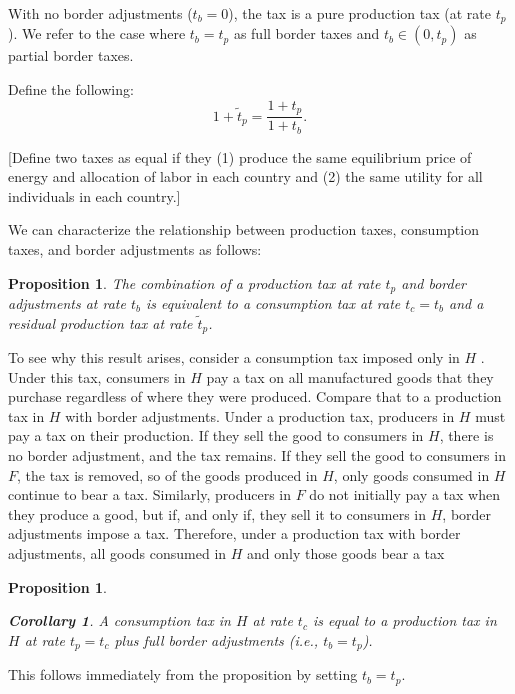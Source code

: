 \documentclass[notitlepage,12pt]{article}
\newtheorem{corollary}[theorem]{Corollary}
\newtheorem{proposition}[theorem]{Proposition}
\begin{document}
With no border adjustments ($t_{b}=0$), the tax is a pure production tax (at
rate $t_{p}$). We refer to the case where $t_{b}=t_{p}$ as full border taxes
and $t_{b}\in \left( 0,t_{p}\right) $ as partial border taxes. 

Define the following:%
\begin{equation*}
1+\tilde{t}_{p}=\frac{1+t_{p}}{1+t_{b}}.
\end{equation*}

[Define two taxes as equal if they (1) produce the same equilibrium price of
energy and allocation of labor in each country and (2) the same utility for
all individuals in each country.]

We can characterize the relationship between production taxes, consumption
taxes, and border adjustments as follows:

\begin{proposition}
The combination of a production tax at rate $t_{p}$ and border adjustments
at rate $t_{b}$ is equivalent to a consumption tax at rate $t_{c}=t_{b}$ and
a residual production tax at rate $\tilde{t}_{p}$.
\end{proposition}

To see why this result arises, consider a consumption tax imposed only in $H$%
. Under this tax, consumers in $H$ pay a tax on all manufactured goods that
they purchase regardless of where they were produced. Compare that to a
production tax in $H$ with border adjustments. Under a production tax,
producers in $H$ must pay a tax on their production. If they sell the good
to consumers in $H$, there is no border adjustment, and the tax remains. If
they sell the good to consumers in $F$, the tax is removed, so of the goods
produced in $H$, only goods consumed in $H$ continue to bear a tax.
Similarly, producers in $F$ do not initially pay a tax when they produce a
good, but if, and only if, they sell it to consumers in $H$, border
adjustments impose a tax. Therefore, under a production tax with border
adjustments, all goods consumed in $H$ and only those goods bear a tax

\begin{proposition}
\begin{corollary}
A consumption tax in $H$ at rate $t_{c}$ is equal to a production tax in $H$
at rate $t_{p}=t_{c}$ plus full border adjustments (i.e., $t_{b}=t_{p}$).
\end{corollary}
\end{proposition}

This follows immediately from the proposition by setting $t_{b}=t_{p}$. 
\end{document}
